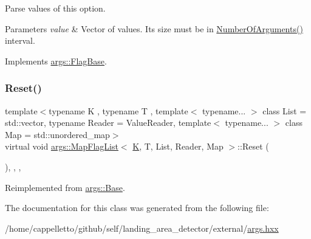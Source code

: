 Parse values of this option.


\begin{DoxyParams}{Parameters}
{\em value} & Vector of values. It\textquotesingle{}s size must be in \hyperlink{classargs_1_1_value_flag_base_a96a10bfb949ad175dcf2ffba6a6ec3b6}{Number\+Of\+Arguments()} interval. \\
\hline
\end{DoxyParams}


Implements \hyperlink{classargs_1_1_flag_base_a3421d9a595c9426dc73f62604cdee84f}{args\+::\+Flag\+Base}.

\mbox{\label{classargs_1_1_map_flag_list_a993bb59f57246e246edbd6ac3fc048eb}} 
\subsubsection{\texorpdfstring{Reset()}{Reset()}}
{\footnotesize\ttfamily template$<$typename K , typename T , template$<$ typename... $>$ class List = std\+::vector, typename Reader  = Value\+Reader, template$<$ typename... $>$ class Map = std\+::unordered\+\_\+map$>$ \\
virtual void \hyperlink{classargs_1_1_map_flag_list}{args\+::\+Map\+Flag\+List}$<$ \hyperlink{cgal__test_8cpp_a891e241aa245ae63618f03737efba309}{K}, T, List, Reader, Map $>$\+::Reset (\begin{DoxyParamCaption}{ }\end{DoxyParamCaption})\hspace{0.3cm}{\ttfamily [inline]}, {\ttfamily [override]}, {\ttfamily [virtual]}, {\ttfamily [noexcept]}}



Reimplemented from \hyperlink{classargs_1_1_base_ac7cfc851174f71e00173121d3013dab1}{args\+::\+Base}.



The documentation for this class was generated from the following file\+:\begin{DoxyCompactItemize}
\item 
/home/cappelletto/github/self/landing\+\_\+area\+\_\+detector/external/\hyperlink{args_8hxx}{args.\+hxx}\end{DoxyCompactItemize}
